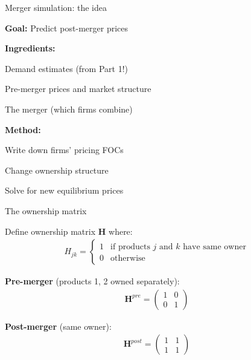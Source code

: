 \documentclass[notes,11pt, aspectratio=169]{beamer}
\newenvironment{wideitemize}{\itemize\addtolength{\itemsep}{10pt}}{\enditemize}
\newenvironment{wideenumerate}{\enumerate\addtolength{\itemsep}{10pt}}{\endenumerate}
\begin{document}
\begin{frame}{Merger simulation: the idea}
	\begin{wideitemize}
		\item \textbf{Goal:} Predict post-merger prices
		\item \textbf{Ingredients:}
		\begin{wideenumerate}
			\vspace{5pt}
			\item Demand estimates (from Part 1!)
			\item Pre-merger prices and market structure
			\item The merger (which firms combine)
		\end{wideenumerate}
		\item \textbf{Method:}
		\begin{wideenumerate}
			\vspace{5pt}
			\item Write down firms' pricing FOCs
			\item Change ownership structure
			\item Solve for new equilibrium prices
		\end{wideenumerate}
	\end{wideitemize}
\end{frame}

\begin{frame}{The ownership matrix}
	\begin{wideitemize}
		\item Define ownership matrix $\mathbf{H}$ where:
		\begin{align*}
			H_{jk} = \begin{cases} 1 & \text{if products } j \text{ and } k \text{ have same owner} \\ 0 & \text{otherwise} \end{cases}
		\end{align*}
		\item \textbf{Pre-merger} (products 1, 2 owned separately):
		\begin{align*}
			\mathbf{H}^{pre} = \begin{pmatrix} 1 & 0 \\ 0 & 1 \end{pmatrix}
		\end{align*}
		\item \textbf{Post-merger} (same owner):
		\begin{align*}
			\mathbf{H}^{post} = \begin{pmatrix} 1 & 1 \\ 1 & 1 \end{pmatrix}
		\end{align*}
	\end{wideitemize}
\end{frame}
\end{document}
